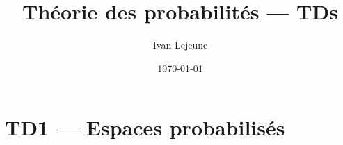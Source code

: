 \documentclass[french,a4paper,10pt]{article}
\title{\color{astral} \sffamily \bfseries Théorie des probabilités --- TDs}
\author{Ivan Lejeune}
\date{\today}
\begin{document}
    \maketitle
    \tableofcontents

    \section*{TD1 --- Espaces probabilisés}\label{sec:TD1}
    \setcounter{section}{1}
    \setcounter{tdcounter}{0}
    
    \newpage

%
\end{document}
